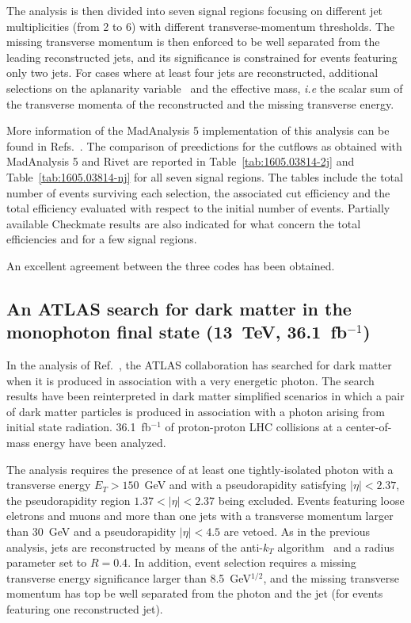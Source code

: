 \documentclass[11pt]{cernrep}
\begin{document}
The analysis is then divided into seven signal regions focusing on different jet
multiplicities (from 2 to 6) with different transverse-momentum thresholds. The
missing transverse momentum is then enforced to be well separated from the
leading reconstructed jets, and its significance is constrained for events
featuring only two jets. For cases where at least four jets are reconstructed,
additional selections on the aplanarity variable~\cite{Chen:2011ah} and the
effective mass, {\it i.e} the scalar sum of the transverse momenta of the
reconstructed and the missing transverse energy.

More information of the MadAnalysis 5 implementation of this analysis can be
found in Refs.~\cite{Banerjee:2017wxi,ma5-1605.03814}. The comparison of
preedictions for the cutflows as obtained with MadAnalysis 5 and Rivet are
reported in Table~\ref{tab:1605.03814-2j} and Table~\ref{tab:1605.03814-nj} for
all seven signal regions. The tables include the total number of events
surviving each selection, the associated cut efficiency and the total efficiency
evaluated with respect to the initial number of events. Partially available
Checkmate results are also indicated for what concern the total efficiencies and
for a few signal regions.

An excellent agreement between the three codes has been obtained.

\subsection{An ATLAS search for dark matter in the monophoton final state
  (13~TeV,  36.1~fb$^{-1}$)}

In the analysis of Ref.~\cite{Aaboud:2017dor}, the ATLAS collaboration has
searched for dark matter when it is produced in association with a very
energetic photon. The search results have been reinterpreted in dark matter
simplified scenarios in which a pair of dark matter particles is produced in
association with a photon arising from initial state radiation. 36.1~fb$^{-1}$
of proton-proton LHC collisions at a center-of-mass energy have been analyzed.

The analysis requires the presence of at least one tightly-isolated photon with
a transverse energy $E_T > 150$~GeV and with a pseudorapidity satisfying
$|\eta| < 2.37$, the pseudorapidity region $1.37 < |\eta| < 2.37$ being
excluded. Events featuring loose eletrons and muons and more than one jets with
a transverse momentum larger than 30~GeV and a pseudorapidity $|\eta|<4.5$ are
vetoed. As in the previous analysis, jets are reconstructed by means of the
anti-$k_T$ algorithm~\cite{Cacciari:2008gp}  and a radius parameter set to
$R=0.4$. In addition, event selection requires a missing transverse energy
significance larger than 8.5~GeV$^{1/2}$, and the missing transverse momentum
has top be well separated from the photon and the jet (for events featuring one
reconstructed jet).
\end{document}
